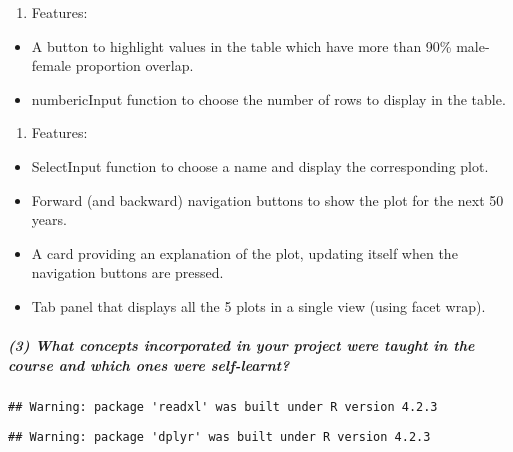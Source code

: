 \documentclass[
]{article}
\providecommand{\tightlist}{%
  \setlength{\itemsep}{0pt}\setlength{\parskip}{0pt}}
\begin{document}
\begin{enumerate}
\def\labelenumi{\Roman{enumi}.}
\setcounter{enumi}{1}
\tightlist
\item
  Features:
\end{enumerate}

\begin{itemize}
\tightlist
\item
  A button to highlight values in the table which have more than 90\%
  male-female proportion overlap.
\item
  numbericInput function to choose the number of rows to display in the
  table.
\end{itemize}

\begin{enumerate}
\def\labelenumi{\Roman{enumi}.}
\setcounter{enumi}{2}
\tightlist
\item
  Features:
\end{enumerate}

\begin{itemize}
\tightlist
\item
  SelectInput function to choose a name and display the corresponding
  plot.
\item
  Forward (and backward) navigation buttons to show the plot for the
  next 50 years.
\item
  A card providing an explanation of the plot, updating itself when the
  navigation buttons are pressed.
\item
  Tab panel that displays all the 5 plots in a single view (using facet
  wrap).
\end{itemize}

\hypertarget{what-concepts-incorporated-in-your-project-were-taught-in-the-course-and-which-ones-were-self-learnt}{%
\subparagraph{\texorpdfstring{\textbf{(3) What concepts incorporated in
your project were taught in the course and which ones were
self-learnt?}}{(3) What concepts incorporated in your project were taught in the course and which ones were self-learnt?}}\label{what-concepts-incorporated-in-your-project-were-taught-in-the-course-and-which-ones-were-self-learnt}}

\begin{verbatim}
## Warning: package 'readxl' was built under R version 4.2.3
\end{verbatim}

\begin{verbatim}
## Warning: package 'dplyr' was built under R version 4.2.3
\end{verbatim}
\end{document}

